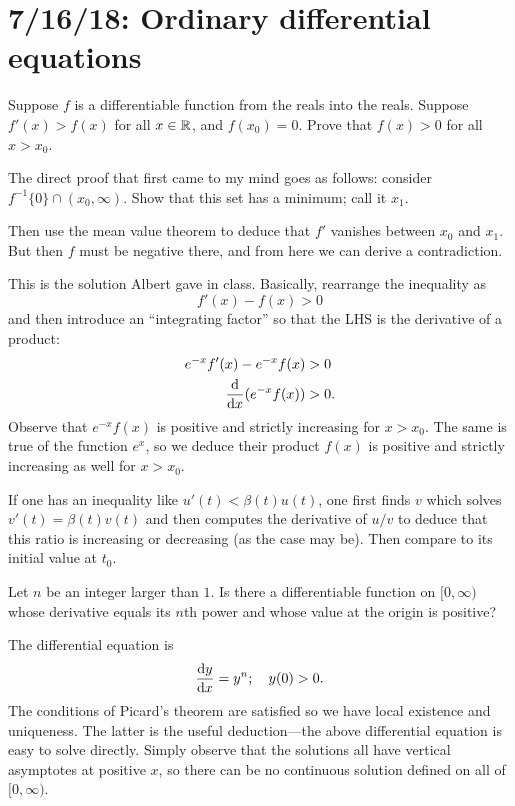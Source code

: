 \section{7/16/18: Ordinary differential equations}

\begin{problem}
	Suppose $f$ is a differentiable function from the reals into the reals. Suppose $f'(x) > f(x)$ for all $x\in \mathbb{R}$, and $f(x_0) = 0$. Prove that $f(x) > 0$ for all $x > x_0$.
\end{problem}
\begin{solution}[1]
	The direct proof that first came to my mind goes as follows: consider $f^{-1}\{0\} \cap (x_0, \infty)$. Show that this set has a minimum; call it $x_1$.
	
	Then use the mean value theorem to deduce that $f'$ vanishes between $x_0$ and $x_1$. But then $f$ must be negative there, and from here we can derive a contradiction.
\end{solution}
\begin{solution}[2]
	This is the solution Albert gave in class. Basically, rearrange the inequality as
	\[
		f'(x) - f(x) > 0
	\]
	and then introduce an ``integrating factor'' so that the LHS is the derivative of a product:
	\begin{align*}
		e^{-x} f'(x) - e^{-x} f(x) &> 0\\
		\deriv[x](e^{-x}f(x)) &> 0. 
	\end{align*}
	Observe that $e^{-x}f(x)$ is positive and strictly increasing for $x > x_0$. The same is true of the function $e^x$, so we deduce their product $f(x)$ is positive and strictly increasing as well for $x > x_0$.
\end{solution}
\begin{rem*}
	If one has an inequality like $u'(t) < \beta(t) u(t)$, one first finds $v$ which solves $v'(t) = \beta(t) v(t)$ and then computes the derivative of $u/v$ to deduce that this ratio is increasing or decreasing (as the case may be). Then compare to its initial value at $t_0$.
\end{rem*}

\begin{problem}
	Let $n$ be an integer larger than $1$. Is there a differentiable function on $[0,\infty)$ whose derivative equals its $n$th power and whose value at the origin is positive?
\end{problem}
\begin{solution}
	The differential equation is
	\[
		\deriv[x][y] = y^n; \quad y(0) > 0.
	\]
	The conditions of Picard's theorem are satisfied so we have local existence and uniqueness. The latter is the useful deduction---the above differential equation is easy to solve directly. Simply observe that the solutions all have vertical asymptotes at positive $x$, so there can be no continuous solution defined on all of $[0,\infty)$.
\end{solution}

